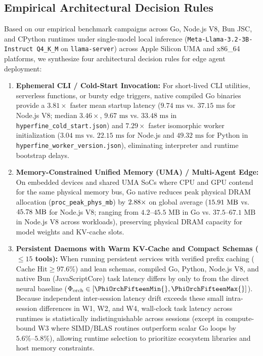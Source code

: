 \documentclass[11pt,a4paper]{article}
\begin{document}
\subsection{Empirical Architectural Decision Rules}
Based on our empirical benchmark campaigns across Go, Node.js V8, Bun JSC, and CPython runtimes under single-model local inference (\texttt{Meta-Llama-3.2-3B-Instruct Q4\_K\_M} on \texttt{llama-server}) across Apple Silicon UMA and x86\_64 platforms, we synthesize four architectural decision rules for edge agent deployment:
\begin{enumerate}
    \item \textbf{Ephemeral CLI / Cold-Start Invocation:} For short-lived CLI utilities, serverless functions, or bursty edge triggers, native compiled Go binaries provide a $3.81\times$ faster mean startup latency ($9.74\text{ ms}$ vs. $37.15\text{ ms}$ for Node.js V8; median $3.46\times$, $9.67\text{ ms}$ vs. $33.48\text{ ms}$ in \texttt{hyperfine\_cold\_start.json}) and $7.29\times$ faster isomorphic worker initialization ($3.04\text{ ms}$ vs. $22.15\text{ ms}$ for Node.js and $49.32\text{ ms}$ for Python in \texttt{hyperfine\_worker\_version.json}), eliminating interpreter and runtime bootstrap delays.
    \item \textbf{Memory-Constrained Unified Memory (UMA) / Multi-Agent Edge:} On embedded devices and shared UMA SoCs where CPU and GPU contend for the same physical memory bus, Go native reduces peak physical DRAM allocation (\texttt{proc\_peak\_phys\_mb}) by $2.88\times$ on global average ($15.91\text{ MB}$ vs. $45.78\text{ MB}$ for Node.js V8; ranging from $4.2\text{--}45.5\text{ MB}$ in Go vs. $37.5\text{--}67.1\text{ MB}$ in Node.js V8 across workloads), preserving physical DRAM capacity for model weights and KV-cache slots.
    \item \textbf{Persistent Daemons with Warm KV-Cache and Compact Schemas ($\le 15$ tools):} When running persistent services with verified prefix caching ($\text{Cache Hit} \ge 97.6\%$) and lean schemas, compiled Go, Python, Node.js V8, and native Bun (JavaScriptCore) task latency differs by only \DeviationNeuralMin{} to \DeviationNeuralMax{} from the direct neural baseline ($\Phi_{\text{orch}} \in [\PhiOrchFifteenMin{}, \PhiOrchFifteenMax{}]$). Because independent inter-session latency drift exceeds these small intra-session differences in W1, W2, and W4, wall-clock task latency across runtimes is statistically indistinguishable across sessions (except in compute-bound W3 where SIMD/BLAS routines outperform scalar Go loops by $5.6\%\text{--}5.8\%$), allowing runtime selection to prioritize ecosystem libraries and host memory constraints.

\end{enumerate}
\end{document}

